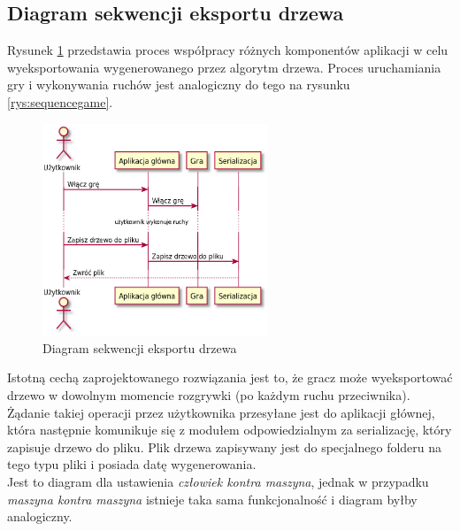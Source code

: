 \documentclass{article}
\newcommand{\modulename}[1]{\textit{#1}}
\begin{document}
\clearpage
\subsection{Diagram sekwencji eksportu drzewa}
Rysunek \ref{rys:sequenceserialize} przedstawia proces współpracy różnych komponentów aplikacji w celu wyeksportowania wygenerowanego przez algorytm drzewa. Proces uruchamiania gry i wykonywania ruchów jest analogiczny do tego na rysunku \ref{rys:sequencegame}. 
\begin{figure}[h]
	\centering
	\includegraphics[width=0.6\textwidth]{serialize_sequence_simplified}
	\caption{Diagram sekwencji eksportu drzewa}
	\label{rys:sequenceserialize}
\end{figure}

\noindent Istotną cechą zaprojektowanego rozwiązania jest to, że gracz może wyeksportować drzewo w dowolnym momencie rozgrywki (po każdym ruchu przeciwnika). Żądanie takiej operacji przez użytkownika przesyłane jest do aplikacji głównej, która następnie komunikuje się z modułem odpowiedzialnym za serializację, który zapisuje drzewo do pliku. Plik drzewa zapisywany jest do specjalnego folderu na tego typu pliki i posiada datę wygenerowania.\\

\noindent Jest to diagram dla ustawienia \modulename{człowiek kontra maszyna}, jednak w przypadku \modulename{maszyna kontra maszyna} istnieje taka sama funkcjonalność i diagram byłby analogiczny.

\clearpage
\end{document}
